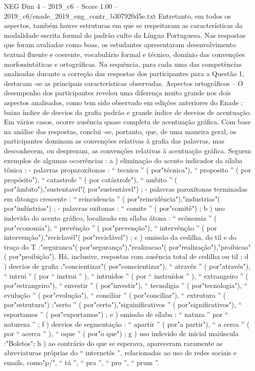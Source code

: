 \begin{textsample}{NEG Dim 4 – 2019\_c6 – Score 1.00 – 2019\_c6/enade\_2019\_eng\_contr\_b307920d5e.txt}
Entretanto, em todos os aspectos, também houve estruturas em que se respeitaram as características da modalidade escrita formal do padrão culto da Língua Portuguesa.
Nas respostas que foram avaliadas como boas, os estudantes apresentaram desenvolvimento textual fluente e coerente, vocabulário formal e técnico, domínio das convenções morfossintáticas e ortográficas.
Na sequência, para cada uma das competências analisadas durante a correção das respostas dos participantes para a Questão 1, destacam -se as principais características observadas.
Aspectos ortográficos – O desempenho dos participantes revelou uma diferença muito grande nos dois aspectos analisados, como tem sido observado em edições anteriores do Enade : baixo índice de desvios da grafia padrão e grande índice de desvios de acentuação.
Em vários casos, ocorre ausência quase completa de acentuação gráfica.
Com base na análise das respostas, conclui -se, portanto, que, de uma maneira geral, os participantes dominam as convenções relativas à grafia das palavras, mas desconhecem, ou desprezam, as convenções relativas à acentuação gráfica.
Seguem exemplos de algumas ocorrências : a ) eliminação do acento indicador da sílaba tônica : - palavras proparoxítonas : “ tecnica ” ( por"técnica"), “ proposito ” ( por propósito"), “ catastrofe ” ( por catástrofe"), “ ambito ” ( por"âmbito"),"sustentavel"( por"sustentável") ; - palavras paroxítonas terminadas em ditongo crescente : “ reincidencia ” ( por"reincidência"),"industrias"( por"indústrias") ; - palavras oxítonas : “ comite ” ( por"comitê") ; b ) uso indevido do acento gráfico, localizado em sílaba átona : “ ecônomia ” ( por"economia"), “ prevênção ” ( por"prevenção"), “ intervênção ” ( por intervenção"),"reciclavél"( por"reciclável") ; c ) omissão da cedilha, do til e do traço do T :"seguranca"( por"segurança"),"realizacao"( por"realização"),"proibicao"( por"proibição").
Há, inclusive, respostas com ausência total de cedilha ou til ; d ) desvios de grafia :"concientizar"( por"conscientizar"), “ atravéz ” ( por"através"), “ intrui ” ( por “ instrui ” ), “ intruídos ” ( por “ instruídos ” ), “ extrangeiro ” ( por"estrangeiro"), “ envestir ” ( por"investir"), “ tecnoligia ” ( por"tecnologia"), “ evulução ” ( por"evolução"), “ consiliar ” ( por"conciliar"), “ extrutura ” ( por"estrutura") ;"serto ” ( por"certo"),"siguinificativos ” ( por"significativos"), “ esportamos ” ( por"exportamos") ; e ) omissão de sílaba : “ natuza ” por “ natureza ” ; f ) desvios de segmentação : “ apartir ” ( por"a partir"), “ a cerca ” ( por “ acerca ” ), “ oque ” ( por"o que") ; g ) uso indevido de inicial maiúscula :"Boletos"; h ) ao contrário do que se esperava, apareceram raramente as abreviaturas próprias do “ internetês ”, relacionadas ao uso de redes sociais e emails, como"p/", “ tá ”, “ pra ”, “ pro ”, “ prum ”.

\end{textsample}
